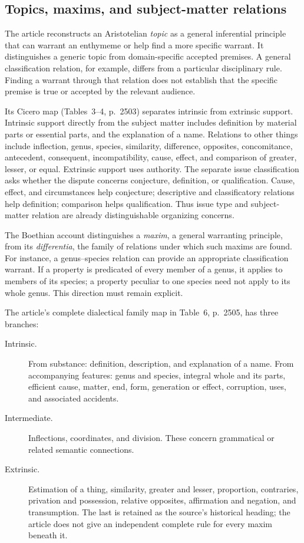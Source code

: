 \subsection{Topics, maxims, and subject-matter relations}

The article reconstructs an Aristotelian \emph{topic} as a general
inferential principle that can warrant an enthymeme or help find
a more specific warrant. It distinguishes a generic topic from
domain-specific accepted premises. A general classification relation,
for example, differs from a particular disciplinary rule.
Finding a warrant through that relation does not establish that
the specific premise is true or accepted by the relevant audience.

Its Cicero map (Tables~3--4, p.~2503) separates intrinsic from
extrinsic support. Intrinsic support directly from the subject matter
includes definition by material parts or essential parts, and the
explanation of a name. Relations to other things include inflection,
genus, species, similarity, difference, opposites, concomitance,
antecedent, consequent, incompatibility, cause, effect, and comparison
of greater, lesser, or equal. Extrinsic support uses authority.
The separate issue classification asks whether the dispute concerns
conjecture, definition, or qualification. Cause, effect, and circumstances
help conjecture; descriptive and classificatory relations help
definition; comparison helps qualification. Thus issue type and
subject-matter relation are already distinguishable organizing concerns.

The Boethian account distinguishes a \emph{maxim}, a general
warranting principle, from its \emph{differentia}, the family of
relations under which such maxims are found.
For instance, a genus--species relation can provide an appropriate
classification warrant. If a property is predicated of every member
of a genus, it applies to members of its species; a property peculiar
to one species need not apply to its whole genus.
This direction must remain explicit.

The article's complete dialectical family map in Table~6, p.~2505,
has three branches:
\begin{description}
\item[Intrinsic.] From substance: definition, description, and explanation
of a name. From accompanying features: genus and species, integral
whole and its parts, efficient cause, matter, end, form, generation
or effect, corruption, uses, and associated accidents.
\item[Intermediate.] Inflections, coordinates, and division.
These concern grammatical or related semantic connections.
\item[Extrinsic.] Estimation of a thing, similarity, greater and lesser,
proportion, contraries, privation and possession, relative opposites,
affirmation and negation, and transumption.
The last is retained as the source's historical heading; the article
does not give an independent complete rule for every maxim beneath it.
\end{description}

